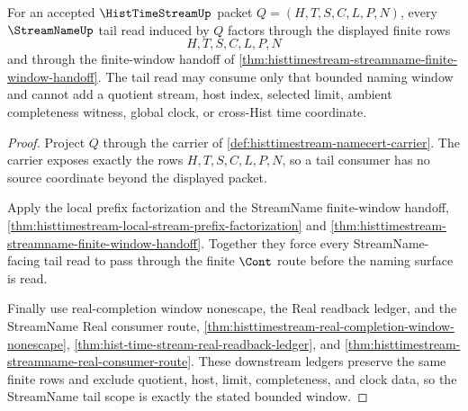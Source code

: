 \begin{theorem}
\label{thm:histtimestream-streamname-tail-scope}
For an accepted $\HistTimeStreamUp$ packet $Q=(H,T,S,C,L,P,N)$, every $\StreamNameUp$ tail read induced by $Q$ factors through the displayed finite rows
$$
H,T,S,C,L,P,N
$$
and through the finite-window handoff of \autoref{thm:histtimestream-streamname-finite-window-handoff}. The tail read may consume only that bounded naming window and cannot add a quotient stream, host index, selected limit, ambient completeness witness, global clock, or cross-Hist time coordinate.
\end{theorem}
\begin{proof}
Project $Q$ through the carrier of \autoref{def:histtimestream-namecert-carrier}. The carrier exposes exactly the rows $H,T,S,C,L,P,N$, so a tail consumer has no source coordinate beyond the displayed packet.

Apply the local prefix factorization and the StreamName finite-window handoff, \autoref{thm:histtimestream-local-stream-prefix-factorization} and \autoref{thm:histtimestream-streamname-finite-window-handoff}. Together they force every StreamName-facing tail read to pass through the finite $\Cont$ route before the naming surface is read.

Finally use real-completion window nonescape, the Real readback ledger, and the StreamName Real consumer route, \autoref{thm:histtimestream-real-completion-window-nonescape}, \autoref{thm:hist-time-stream-real-readback-ledger}, and \autoref{thm:histtimestream-streamname-real-consumer-route}. These downstream ledgers preserve the same finite rows and exclude quotient, host, limit, completeness, and clock data, so the StreamName tail scope is exactly the stated bounded window.
\end{proof}


